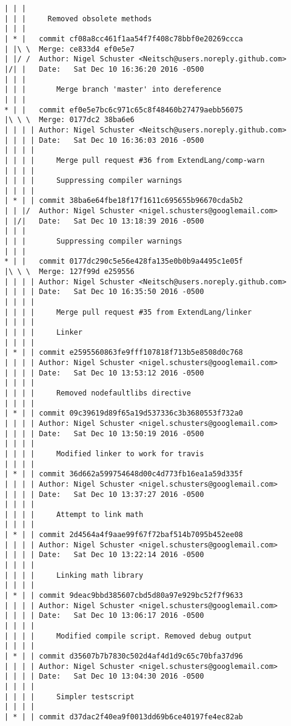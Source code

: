 \begin{lstlisting}
| | | 
| | |     Removed obsolete methods
| | |      
| * |   commit cf08a8cc461f1aa54f7f408c78bbf0e20269ccca
| |\ \  Merge: ce833d4 ef0e5e7
| |/ /  Author: Nigel Schuster <Neitsch@users.noreply.github.com>
|/| |   Date:   Sat Dec 10 16:36:20 2016 -0500
| | |   
| | |       Merge branch 'master' into dereference
| | |      
* | |   commit ef0e5e7bc6c971c65c8f48460b27479aebb56075
|\ \ \  Merge: 0177dc2 38ba6e6
| | | | Author: Nigel Schuster <Neitsch@users.noreply.github.com>
| | | | Date:   Sat Dec 10 16:36:03 2016 -0500
| | | | 
| | | |     Merge pull request #36 from ExtendLang/comp-warn
| | | |     
| | | |     Suppressing compiler warnings
| | | |     
| * | | commit 38ba6e64fbe18f17f1611c695655b96670cda5b2
| | |/  Author: Nigel Schuster <nigel.schusters@googlemail.com>
| |/|   Date:   Sat Dec 10 13:18:39 2016 -0500
| | |   
| | |       Suppressing compiler warnings
| | |      
* | |   commit 0177dc290c5e56e428fa135e0b0b9a4495c1e05f
|\ \ \  Merge: 127f99d e259556
| | | | Author: Nigel Schuster <Neitsch@users.noreply.github.com>
| | | | Date:   Sat Dec 10 16:35:50 2016 -0500
| | | | 
| | | |     Merge pull request #35 from ExtendLang/linker
| | | |     
| | | |     Linker
| | | |     
| * | | commit e2595560863fe9fff107818f713b5e8508d0c768
| | | | Author: Nigel Schuster <nigel.schusters@googlemail.com>
| | | | Date:   Sat Dec 10 13:53:12 2016 -0500
| | | | 
| | | |     Removed nodefaultlibs directive
| | | |     
| * | | commit 09c39619d89f65a19d537336c3b3680553f732a0
| | | | Author: Nigel Schuster <nigel.schusters@googlemail.com>
| | | | Date:   Sat Dec 10 13:50:19 2016 -0500
| | | | 
| | | |     Modified linker to work for travis
| | | |     
| * | | commit 36d662a599754648d00c4d773fb16ea1a59d335f
| | | | Author: Nigel Schuster <nigel.schusters@googlemail.com>
| | | | Date:   Sat Dec 10 13:37:27 2016 -0500
| | | | 
| | | |     Attempt to link math
| | | |     
| * | | commit 2d4564a4f9aae99f67f72baf514b7095b452ee08
| | | | Author: Nigel Schuster <nigel.schusters@googlemail.com>
| | | | Date:   Sat Dec 10 13:22:14 2016 -0500
| | | | 
| | | |     Linking math library
| | | |     
| * | | commit 9deac9bbd385607cbd5d80a97e929bc52f7f9633
| | | | Author: Nigel Schuster <nigel.schusters@googlemail.com>
| | | | Date:   Sat Dec 10 13:06:17 2016 -0500
| | | | 
| | | |     Modified compile script. Removed debug output
| | | |     
| * | | commit d35607b7b7830c502d4af4d1d9c65c70bfa37d96
| | | | Author: Nigel Schuster <nigel.schusters@googlemail.com>
| | | | Date:   Sat Dec 10 13:04:30 2016 -0500
| | | | 
| | | |     Simpler testscript
| | | |     
| * | | commit d37dac2f40ea9f0013dd69b6ce40197fe4ec82ab

\end{lstlisting}
